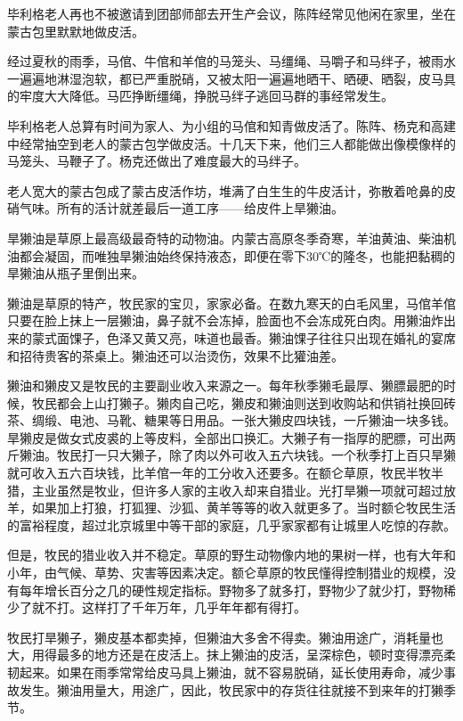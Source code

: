 \par 毕利格老人再也不被邀请到团部师部去开生产会议，陈阵经常见他闲在家里，坐在蒙古包里默默地做皮活。
\par 经过夏秋的雨季，马倌、牛倌和羊倌的马笼头、马缰绳、马嚼子和马绊子，被雨水一遍遍地淋湿泡软，都已严重脱硝，又被太阳一遍遍地晒干、晒硬、晒裂，皮马具的牢度大大降低。马匹挣断缰绳，挣脱马绊子逃回马群的事经常发生。
\par 毕利格老人总算有时间为家人、为小组的马倌和知青做皮活了。陈阵、杨克和高建中经常抽空到老人的蒙古包学做皮活。十几天下来，他们三人都能做出像模像样的马笼头、马鞭子了。杨克还做出了难度最大的马绊子。
\par 老人宽大的蒙古包成了蒙古皮活作坊，堆满了白生生的牛皮活计，弥散着呛鼻的皮硝气味。所有的活计就差最后一道工序——给皮件上旱獭油。
\par 旱獭油是草原上最高级最奇特的动物油。内蒙古高原冬季奇寒，羊油黄油、柴油机油都会凝固，而唯独旱獭油始终保持液态，即便在零下30℃的隆冬，也能把黏稠的旱獭油从瓶子里倒出来。
\par 獭油是草原的特产，牧民家的宝贝，家家必备。在数九寒天的白毛风里，马倌羊倌只要在脸上抹上一层獭油，鼻子就不会冻掉，脸面也不会冻成死白肉。用獭油炸出来的蒙式面馃子，色泽又黄又亮，味道也最香。獭油馃子往往只出现在婚礼的宴席和招待贵客的茶桌上。獭油还可以治烫伤，效果不比獾油差。
\par 獭油和獭皮又是牧民的主要副业收入来源之一。每年秋季獭毛最厚、獭膘最肥的时候，牧民都会上山打獭子。獭肉自己吃，獭皮和獭油则送到收购站和供销社换回砖茶、绸缎、电池、马靴、糖果等日用品。一张大獭皮四块钱，一斤獭油一块多钱。旱獭皮是做女式皮裘的上等皮料，全部出口换汇。大獭子有一指厚的肥膘，可出两斤獭油。牧民打一只大獭子，除了肉以外可收入五六块钱。一个秋季打上百只旱獭就可收入五六百块钱，比羊倌一年的工分收入还要多。在额仑草原，牧民半牧半猎，主业虽然是牧业，但许多人家的主收入却来自猎业。光打旱獭一项就可超过放羊，如果加上打狼，打狐狸、沙狐、黄羊等等的收入就更多了。当时额仑牧民生活的富裕程度，超过北京城里中等干部的家庭，几乎家家都有让城里人吃惊的存款。
\par 但是，牧民的猎业收入并不稳定。草原的野生动物像内地的果树一样，也有大年和小年，由气候、草势、灾害等因素决定。额仑草原的牧民懂得控制猎业的规模，没有每年增长百分之几的硬性规定指标。野物多了就多打，野物少了就少打，野物稀少了就不打。这样打了千年万年，几乎年年都有得打。
\par 牧民打旱獭子，獭皮基本都卖掉，但獭油大多舍不得卖。獭油用途广，消耗量也大，用得最多的地方还是在皮活上。抹上獭油的皮活，呈深棕色，顿时变得漂亮柔韧起来。如果在雨季常常给皮马具上獭油，就不容易脱硝，延长使用寿命，减少事故发生。獭油用量大，用途广，因此，牧民家中的存货往往就接不到来年的打獭季节。
